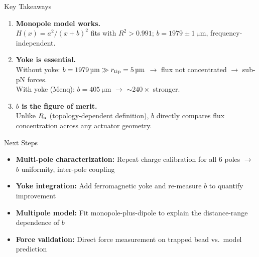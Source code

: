 \documentclass[aspectratio=169,11pt]{beamer}
\begin{document}
\begin{frame}{Key Takeaways}
\begin{enumerate}
\item \textbf{Monopole model works.}\\
$H(x) = a^2/(x+b)^2$ fits with $R^2 > 0.991$;
$b = 1979 \pm \SI{1}{\um}$, frequency-independent.

\vspace{0.8em}
\item \textbf{Yoke is essential.}\\
Without yoke: $b = \SI{1979}{\um} \gg \rtip = \SI{5}{\um}$ $\to$
flux not concentrated $\to$ sub-pN forces.\\
With yoke (Menq): $b = \SI{405}{\um}$ $\to$ $\sim 240\times$ stronger.

\vspace{0.8em}
\item \textbf{$b$ is the figure of merit.}\\
Unlike $R_\mathrm{a}$ (topology-dependent definition), $b$ directly compares
flux concentration across any actuator geometry.
\end{enumerate}
\end{frame}

\begin{frame}{Next Steps}
\begin{itemize}
\item \textbf{Multi-pole characterization:} Repeat charge calibration for
all 6 poles $\to$ $b$ uniformity, inter-pole coupling

\vspace{0.5em}
\item \textbf{Yoke integration:} Add ferromagnetic yoke and re-measure $b$
to quantify improvement

\vspace{0.5em}
\item \textbf{Multipole model:} Fit monopole-plus-dipole to explain the
distance-range dependence of $b$

\vspace{0.5em}
\item \textbf{Force validation:} Direct force measurement on trapped bead
vs.\ model prediction
\end{itemize}
\end{frame}
\end{document}
